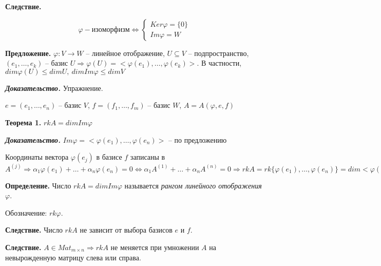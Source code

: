 \vspace{\baselineskip}
\textbf{Следствие.}  

\begin{equation*}
	\varphi - изоморфизм \Leftrightarrow \begin{cases}
		Ker \varphi = \{0\} \\
		Im \varphi = W
	\end{cases}
\end{equation*}

\vspace{\baselineskip}
\textbf{Предложение.} $\varphi : V \rightarrow W$ -- линейное отображение, $U \subseteq V$ -- подпространство, $(e_1, \dots, e_k)$ -- базис $U \Rightarrow \varphi (U) = < \varphi(e_1), \dots, \varphi (e_k)>$. В частности, $dim \varphi (U) \leq dim U, \ dim Im \varphi \leq dim V$

\vspace{\baselineskip}
\textbf{\textit{Доказательство.}} Упражнение.

\vspace{\baselineskip}
$e = (e_1, \dots, e_n)$ -- базис $V$, $f = (f_1, \dots, f_m)$ -- базис $W$, $A = A(\varphi, e, f)$

\vspace{\baselineskip}
\textbf{Теорема 1.} $rkA = dim Im \varphi$

\vspace{\baselineskip}
\textbf{\textit{Доказательство.}} $Im \varphi = <\varphi(e_1), \dots, \varphi(e_n)>$ -- по предложению

Координаты вектора $\varphi(e_j)$ в базисе $f$ записаны в $A^{(j)} \Rightarrow \alpha_1 \varphi(e_1) + \dots + \alpha_n \varphi(e_n) = 0 \Leftrightarrow \alpha_1 A^{(1)} + \dots + \alpha_n A^{(n)} = 0 \Rightarrow rkA = rk \{\varphi(e_1), \dots, \varphi(e_n) \} = dim <\varphi(e_1), \dots, \varphi(e_n)> = dim Im \varphi \ \lhd$

\vspace{\baselineskip}
\textbf{Определение.} Число $rkA = dim Im \varphi$ называется \textit{рангом линейного отображения} $\varphi$.

Обозначение: $rk \varphi$.

\vspace{\baselineskip}
\textbf{Следствие.} Число $rkA$ не зависит от выбора базисов $e$ и $f$.

\vspace{\baselineskip}
\textbf{Следствие.} $A \in Mat_{m \times n} \Rightarrow rkA$ не меняется при умножении $A$ на невырожденную матрицу слева или справа.

